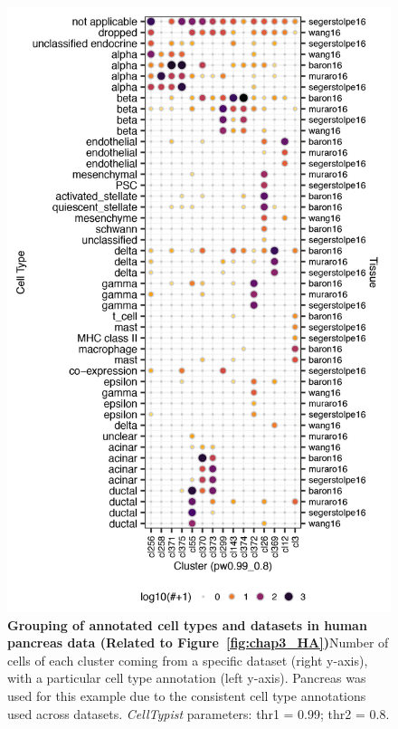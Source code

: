 \begin{figure}[ht!] 
\centering    
\includegraphics[scale=0.85]{Appendix2/Figs/appB_ctclpancreas.png} %
\caption[Grouping of annotated cell types and datasets in human pancreas data]{\textbf{Grouping of annotated cell types and datasets in human pancreas data (Related to Figure~\ref{fig:chap3_HA})}\newline Number of cells of each cluster coming from a specific dataset (right y-axis), with a particular cell type annotation (left y-axis). Pancreas was used for this example due to the consistent cell type annotations used across datasets. \textit{CellTypist} parameters: thr1 = 0.99; thr2 = 0.8.}
\label{fig:appB_panc}
\end{figure}

